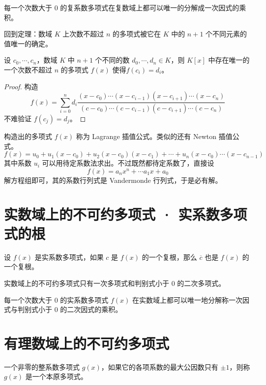 \begin{theorem}
    每一个次数大于 $0$ 的复系数多项式在复数域上都可以唯一的分解成一次因式的乘积。
\end{theorem}

回到定理：数域 $K$ 上次数不超过 $n$ 的多项式被它在 $K$ 中的 $n+1$ 个不同元素的值唯一的确定。

\begin{theorem}
    设 $c_0,\cdots,c_n$，数域 $K$ 中 $n+1$ 个不同的数 $d_0,\cdots,d_n \in K$，则 $K[x]$ 中存在唯一的一个次数不超过 $n$ 的多项式 $f(x)$ 使得$f(c_i) = d_i$。
\end{theorem}
\begin{proof}
    构造
    \[ f(x) = \sum_{i=0}^n d_i \frac{(x-c_0)\cdots(x-c_{i-1})(x-c_{i+1})\cdots(x-c_n)}{(c-c_0)\cdots(c-c_{i-1})(c-c_{i+1})\cdots(c-c_n)} \]
    不难验证 $f(c_j) = d_j$。
\end{proof}

构造出的多项式 $f(x)$ 称为 Lagrange 插值公式。类似的还有 Newton 插值公式。
\[ f(x) = u_0 + u_1(x-c_0) + u_2(x-c_0)(x-c_1) + \cdots + u_n(x-c_0)\cdots(x-c_{n-1}) \]
其中系数 $u_i$ 可以用待定系数法求出。不过既然都待定系数了，直接设
\[ f(x) = a_nx^n + \cdots a_1x + a_0 \]
解方程组即可，其的系数行列式是 Vandermonde 行列式，于是必有解。

\section{实数域上的不可约多项式 · 实系数多项式的根}

\begin{theorem}
    设 $f(x)$ 是实系数多项式，如果 $c$ 是 $f(x)$ 的一个复根，那么 $\overline{c}$ 也是 $f(x)$ 的一个复根。
\end{theorem}

\begin{theorem}
    实数域上的不可约多项式只有一次多项式和判别式小于 $0$ 的二次多项式。
\end{theorem}

\begin{theorem}
    每一个次数大于 $0$ 的实系数多项式 $f(x)$ 在实数域上都可以唯一地分解称一次因式与判别式小于 $0$ 的二次因式的乘积。
\end{theorem}

\section{有理数域上的不可约多项式}

\begin{definition}
    一个非零的整系数多项式 $g(x)$，如果它的各项系数的最大公因数只有 $\pm 1$，则称 $g(x)$ 是一个本原多项式。
\end{definition}

